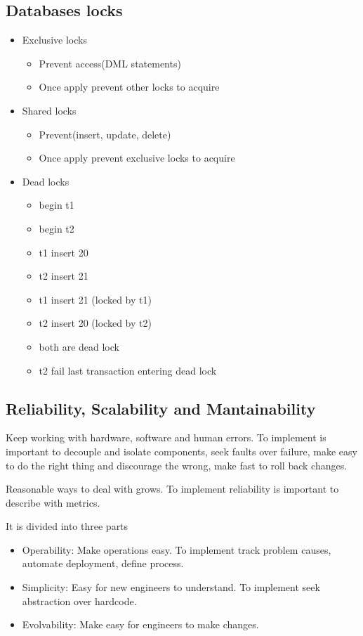 \documentclass[../../main.tex]{subfiles}
\begin{document}
\subsection{Databases locks}
\begin{itemize}
    \item Exclusive locks
    \begin{itemize}
        \item Prevent access(DML statements)
        \item Once apply prevent other locks to acquire
    \end{itemize}
    \item Shared locks
    \begin{itemize}
        \item Prevent(insert, update, delete)
        \item Once apply prevent exclusive locks to acquire
    \end{itemize}
    \item Dead locks
    \begin{itemize}
        \item begin t1
        \item begin t2
        \item t1 insert 20
        \item t2 insert 21
        \item t1 insert 21 (locked by t1)
        \item t2 insert 20 (locked by t2)
        \item both are dead lock
        \item t2 fail last transaction entering dead lock
    \end{itemize}
\end{itemize}


\subsection{Reliability, Scalability and Mantainability}
\begin{definition}[Reliability]
    Keep working with hardware, software and human errors. To implement is important to decouple and isolate components, seek faults over failure, make easy to do the right thing and discourage the wrong, make fast to roll back changes.
\end{definition}
\begin{definition}[Scalability]
    Reasonable ways to deal with grows. To implement reliability is important to describe with metrics.
\end{definition}
\begin{definition}[Maintainability]
    It is divided into three parts
    \begin{itemize}
        \item Operability: Make operations easy. To implement track problem causes, automate deployment, define process.
        \item Simplicity: Easy for new engineers to understand. To implement seek abstraction over hardcode.
        \item Evolvability: Make easy for engineers to make changes.
    \end{itemize}
\end{definition}
\end{document}
